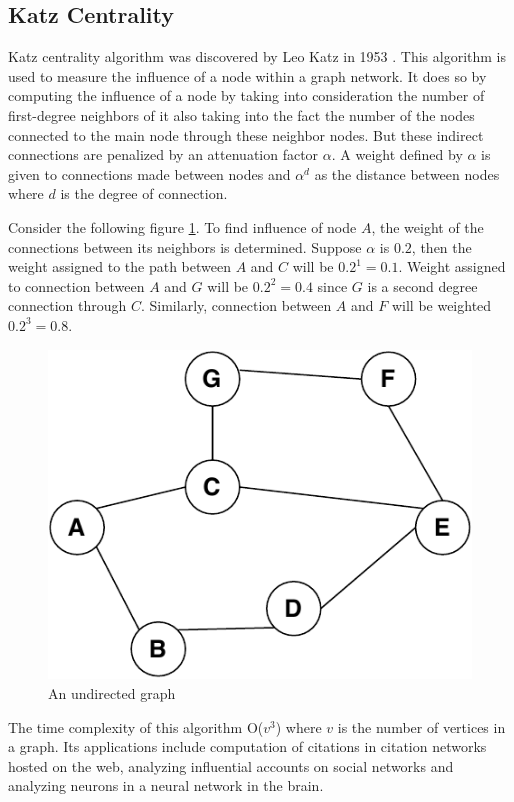 \documentclass[journal,twoside,web]{ieeecolor}
\begin{document}
\subsection{Katz Centrality}
Katz centrality algorithm was discovered by Leo Katz in 1953 \cite{58}. This algorithm is used to measure the influence of a node within a graph network. It does so by computing the influence of a node by taking into consideration the number of first-degree neighbors of it also taking into the fact the number of the nodes connected to the main node through these neighbor nodes. But these indirect connections are penalized by an attenuation factor $\alpha$. A weight defined by $\alpha$ is given to connections made between nodes and $\alpha$$^d$  as the distance between nodes where $d$ is the degree of connection.

Consider the following figure \ref{fig12}. To find influence of node $A$, the weight of the connections between its neighbors is determined. Suppose $\alpha$ is $0.2$, then the weight assigned to the path between $A$ and $C$ will be $0.2^1 = 0.1$. Weight assigned to connection between $A$ and $G$ will be $0.2^2 = 0.4$ since $G$ is a second degree connection through $C$. Similarly, connection between $A$ and $F$ will be weighted $0.2^3 = 0.8$.

\begin{figure}[!h]
    \centerline{\includegraphics[scale=0.6]{figures/katz.pdf}}
    \caption{An undirected graph}
    \label{fig12}
\end{figure}

The time complexity of this algorithm O($v^3$) where $v$ is the number of vertices in a graph. Its applications include computation of citations in citation networks hosted on the web, analyzing influential accounts on social networks and analyzing neurons in a neural network in the brain.
\end{document}
